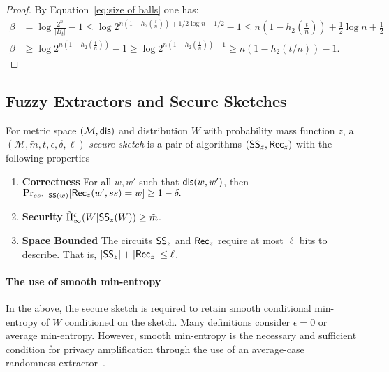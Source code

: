 \begin{proof}
By Equation~\ref{eq:size of balls} one has: 
\begin{align*}
\beta & = \log{\frac{2^n}{|B_t|} -1} \le \log{2^{n\left(1-h_2\left(\frac{t}{n}\right)\right) + 1/2 \log{n}+1/2} -1} \le n\left(1-h_2\left(\frac{t}{n}\right)\right) + \frac{1}{2}\log{n}+ \frac{1}{2}\\
\beta&\ge \log{2^{n\left(1-h_2\left(\frac{t}{n}\right)\right)} -1} \ge \log{2^{n\left(1-h_2\left(\frac{t}{n}\right)\right)-1} } \ge n(1-h_2(t/n))-1.
\end{align*}
\end{proof}


    \subsection{Fuzzy Extractors and Secure Sketches}
\begin{definition}
For metric space $(\mathcal{M}, \mathsf{dis})$ and distribution $W$ with probability mass function $z$, a $(\mathcal{M}, \tilde{m}, t, \epsilon, \delta, \ell)$-\emph{secure sketch} is a pair of algorithms $({\mathsf{SS}}_z, {\mathsf{Rec}}_z)$ with the following properties 
\begin{enumerate} 
\itemsep0em
\item \textbf{Correctness} For all $w, w'$ such that $\mathsf{dis}(w, w')$, then $\Pr_{ss \leftarrow {\ensuremath{\mathsf{SS}}}(w)}[{\mathsf{Rec}}_z(w', ss) = w]\ge 1-\delta.$
\item \textbf{Security}  $\tilde{\mathrm{H}}_\infty^\epsilon(W | {\mathsf{SS}}_z(W)) \ge \tilde{m}$.
\item \textbf{Space Bounded} The circuits ${\mathsf{SS}}_z$ and ${\mathsf{Rec}}_z$ require at most $\ell$ bits to describe.  That is, $|{\mathsf{SS}}_z| +|{\mathsf{Rec}}_z|\le \ell$.
\end{enumerate}
\end{definition}

\paragraph{The use of smooth min-entropy} In the above, the secure sketch is required to retain smooth conditional min-entropy of $W$ conditioned on the sketch.  Many definitions consider $\epsilon=0$ or average min-entropy.  However, smooth min-entropy is the necessary and sufficient condition for privacy amplification through the use of an average-case randomness extractor~\cite{renner2005simple}.

